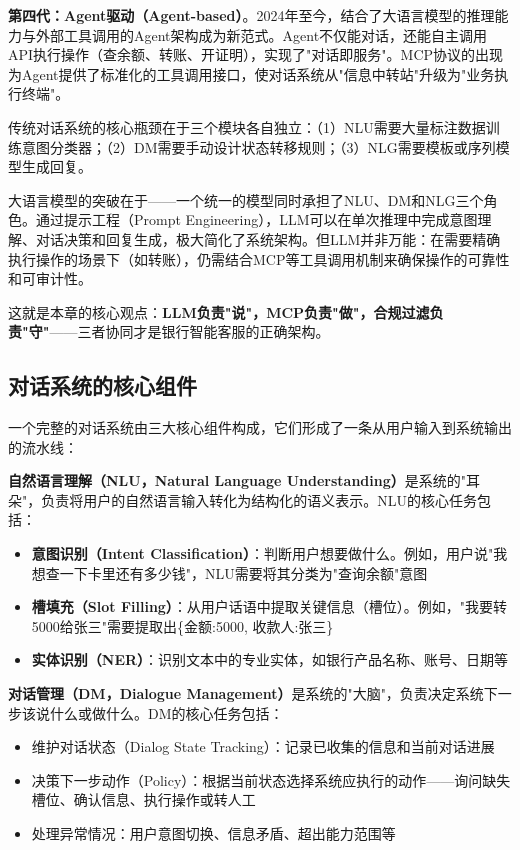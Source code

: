 \textbf{第四代：Agent驱动（Agent-based）}。2024年至今，结合了大语言模型的推理能力与外部工具调用的Agent架构成为新范式。Agent不仅能对话，还能自主调用API执行操作（查余额、转账、开证明），实现了"对话即服务"。MCP协议的出现为Agent提供了标准化的工具调用接口，使对话系统从"信息中转站"升级为"业务执行终端"。

\begin{theorybox}[大语言模型如何改变对话系统架构]
传统对话系统的核心瓶颈在于三个模块各自独立：（1）NLU需要大量标注数据训练意图分类器；（2）DM需要手动设计状态转移规则；（3）NLG需要模板或序列模型生成回复。

大语言模型的突破在于——一个统一的模型同时承担了NLU、DM和NLG三个角色。通过提示工程（Prompt Engineering），LLM可以在单次推理中完成意图理解、对话决策和回复生成，极大简化了系统架构。但LLM并非万能：在需要精确执行操作的场景下（如转账），仍需结合MCP等工具调用机制来确保操作的可靠性和可审计性。

这就是本章的核心观点：\textbf{LLM负责"说"，MCP负责"做"，合规过滤负责"守"}——三者协同才是银行智能客服的正确架构。
\end{theorybox}

\subsection{对话系统的核心组件}

一个完整的对话系统由三大核心组件构成，它们形成了一条从用户输入到系统输出的流水线：

\textbf{自然语言理解（NLU，Natural Language Understanding）}是系统的"耳朵"，负责将用户的自然语言输入转化为结构化的语义表示。NLU的核心任务包括：

\begin{itemize}[leftmargin=2em]
  \item \textbf{意图识别（Intent Classification）}：判断用户想要做什么。例如，用户说"我想查一下卡里还有多少钱"，NLU需要将其分类为"查询余额"意图
  \item \textbf{槽填充（Slot Filling）}：从用户话语中提取关键信息（槽位）。例如，"我要转5000给张三"需要提取出\{金额:5000, 收款人:张三\}
  \item \textbf{实体识别（NER）}：识别文本中的专业实体，如银行产品名称、账号、日期等
\end{itemize}

\textbf{对话管理（DM，Dialogue Management）}是系统的"大脑"，负责决定系统下一步该说什么或做什么。DM的核心任务包括：

\begin{itemize}[leftmargin=2em]
  \item 维护对话状态（Dialog State Tracking）：记录已收集的信息和当前对话进展
  \item 决策下一步动作（Policy）：根据当前状态选择系统应执行的动作——询问缺失槽位、确认信息、执行操作或转人工
  \item 处理异常情况：用户意图切换、信息矛盾、超出能力范围等
\end{itemize}

